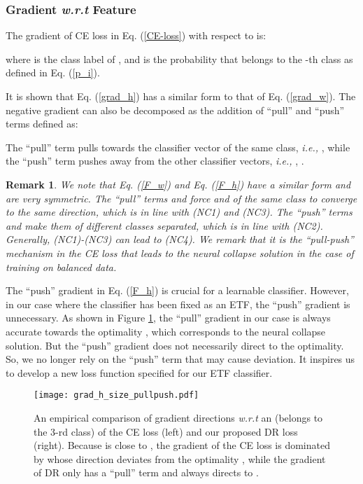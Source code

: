 \documentclass{article}
\newtheorem{remark}{Remark}
\newcommand{\<}{\left\langle}
\renewcommand{\>}{\right\rangle}
\begin{document}
\subsubsection{Gradient \emph{w.r.t} Feature}

The gradient of CE loss in Eq. (\ref{CE-loss}) with respect to  is:

where  is the class label of , and  is the probability that  belongs to the -th class as defined in  Eq. (\ref{p_i}). 

It is shown that Eq. (\ref{grad_h}) has a similar form to that of Eq. (\ref{grad_w}). The negative gradient  can also be decomposed as the addition of ``pull'' and ``push'' terms defined as:

\iffalse

\fi
The ``pull'' term  pulls  towards the classifier vector of the same class, \emph{i.e.,} , while the ``push'' term  pushes  away from the other classifier vectors,  \emph{i.e.,} , .

\begin{remark}
	\label{remark3}
We note that Eq. (\ref{F_w}) and Eq. (\ref{F_h}) have a similar form and are very symmetric. The ``pull'' terms  and  force  and  of the same class to converge to the same direction, which is in line with (NC1) and (NC3). The ``push'' terms  and   make them of different classes separated, which is in line with (NC2). Generally, (NC1)-(NC3) can lead to (NC4). {We remark that it is the ``pull-push'' mechanism in the CE loss that leads to the neural collapse solution in the case of training on balanced data. }
\end{remark}



The ``push'' gradient  in Eq. (\ref{F_h}) is crucial for a learnable classifier. However, in our case where the classifier has been fixed as an ETF, the ``push'' gradient  is unnecessary. As shown in Figure  \ref{fig_grad_h}, the ``pull'' gradient  in our case is always accurate towards the optimality , which corresponds to the neural collapse solution. But the ``push'' gradient does not necessarily direct to the optimality. 
So, we no longer rely on the ``push'' term  that may cause deviation. It inspires us to develop a new loss function specified for our ETF classifier. 

 








\begin{figure}[!t]
\begin{center}
\texttt{[image: grad\_h\_size\_pullpush.pdf]}
		\vspace{-2.mm}
		\caption{An empirical comparison of gradient directions \emph{w.r.t} an  (belongs to the 3-rd class) of the CE loss (left) and our proposed DR loss (right). Because  is close to , the gradient of the CE loss is dominated by   whose direction deviates from the optimality , while the gradient of DR only has a ``pull'' term and always directs to .}
		\label{fig_grad_h}
	\end{center}
	\vspace{-3mm}
\end{figure}
\end{document}
